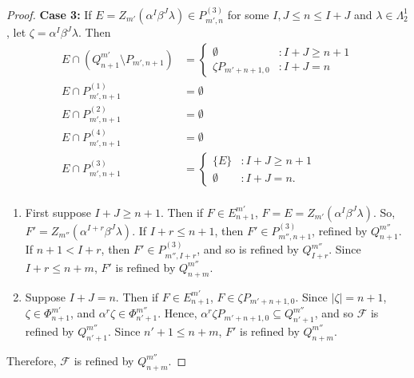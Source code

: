 \documentclass[10pt,a4paper]{amsart}
\newcommand{\La}{\Lambda}
\newcommand{\al}{\alpha}
\newcommand{\be}{\beta}
\newcommand{\emp}{\emptyset}
\newcommand{\la}{\lambda}
\newcommand{\mc}[1]{\mathcal{#1}}
\newcommand{\sm}{\setminus}
\newcommand{\sse}{\subseteq}
\newcommand{\ze}{\zeta}
\begin{document}
\begin{proof}
    \textbf{Case 3:} If $E = Z_{m'}(\al^I \be^J \la) \in P^{(3)}_{m',n}$ for some $I, J \leq n \leq I+J$ and $\la \in \La_2^1$, let $\ze = \al^I \be^J \la$. Then
    \begin{align*}
        E \cap (Q^{m'}_{n+1} \sm P_{m', n+1}) &= \begin{cases}
            \emp &: I+J \geq n+1\\
            \ze P_{m'+n+1, 0} &: I+J=n
        \end{cases}\\
        E \cap P^{(1)}_{m',n+1} &= \emp\\
        E \cap P^{(2)}_{m',n+1} &= \emp\\
        E \cap P^{(4)}_{m',n+1} &= \emp \\
        E \cap P^{(3)}_{m',n+1} &= \begin{cases}
            \{E\} &: I+J \geq n+1\\ \emp &: I+J = n.
        \end{cases}\\
    \end{align*}
    \begin{enumerate}
        \item First suppose $I+J \ge n+1$. Then if $F \in E_{n+1}^{m'}$, $F = E = Z_{m'}(\al^I \be^J \la)$. So, $F' = Z_{m''}(\al^{I+r}\be^J \la)$. If $I+r \le n+1$, then $F' \in P^{(3)}_{m'', n+1}$, refined by $Q_{n+1}^{m''}$. If $n+1 < I+r$, then $F' \in P^{(3)}_{m'',I+r}$, and so is refined by $Q^{m''}_{I+r}$. Since $I+r \leq n+m$, $F'$ is refined by $Q_{n+m}^{m''}$.

        \item Suppose $I+J = n$. Then if $F \in E_{n+1}^{m'}$, $F \in \ze P_{m'+n+1, 0}$. Since $|\ze| = n + 1$, $\ze \in \Phi_{n+1}^{m'}$, and $\al^r \ze \in \Phi_{n'+1}^{m''}$. Hence, $\al^r \ze P_{m'+n+1,0} \sse Q_{n'+1}^{m''}$, and so $\mc{F}$ is refined by $Q_{n'+1}^{m''}$. Since $n'+1 \leq n+m$, $F'$ is refined by $Q_{n+m}^{m''}$.
    \end{enumerate}
    Therefore, $\mc{F}$ is refined by $Q_{n+m}^{m''}$.


\end{proof}
\end{document}
